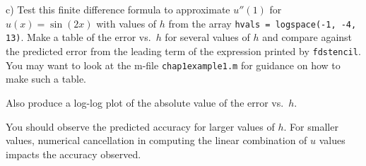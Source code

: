 \begin{solution}\ \\\\
\end{solution}

c)  Test this finite difference formula to approximate $u''(1)$ for $u(x) = \sin(2x)$ with values of $h$ from the array 
  \texttt{hvals = logspace(-1, -4, 13)}. Make a table of the error vs.\ $h$ for several values of $h$ and compare 
  against the predicted error from the leading term of the expression printed by \texttt{fdstencil}. You may want to 
  look at the m-file \texttt{chap1example1.m} for guidance on how to make such a table.

  Also produce a log-log plot of the absolute value of the error vs.~$h$.  

  You should observe the predicted accuracy for larger values of $h$. For smaller values, numerical cancellation in 
  computing the linear combination of $u$ values impacts the accuracy observed.
    
\begin{solution}\ \\\\
\end{solution}
